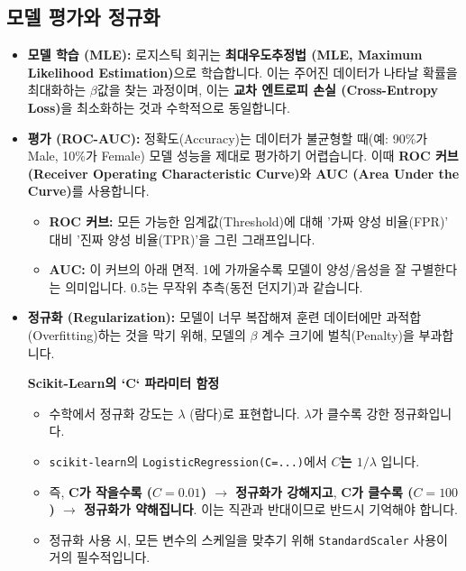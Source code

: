 \documentclass[11pt,a4paper]{book}
\theoremstyle{definition}
\begin{document}
\subsection{모델 평가와 정규화}

\begin{itemize}
    \item \textbf{모델 학습 (MLE):} 로지스틱 회귀는 \textbf{최대우도추정법 (MLE, Maximum Likelihood Estimation)}으로 학습합니다. 이는 주어진 데이터가 나타날 확률을 최대화하는 $\beta$값을 찾는 과정이며, 이는 \textbf{교차 엔트로피 손실 (Cross-Entropy Loss)}을 최소화하는 것과 수학적으로 동일합니다.
    
    \item \textbf{평가 (ROC-AUC):} 정확도(Accuracy)는 데이터가 불균형할 때(예: 90\%가 Male, 10\%가 Female) 모델 성능을 제대로 평가하기 어렵습니다. 이때 \textbf{ROC 커브 (Receiver Operating Characteristic Curve)}와 \textbf{AUC (Area Under the Curve)}를 사용합니다.
    \begin{itemize}
        \item \textbf{ROC 커브:} 모든 가능한 임계값(Threshold)에 대해 '가짜 양성 비율(FPR)' 대비 '진짜 양성 비율(TPR)'을 그린 그래프입니다.         \item \textbf{AUC:} 이 커브의 아래 면적. 1에 가까울수록 모델이 양성/음성을 잘 구별한다는 의미입니다. 0.5는 무작위 추측(동전 던지기)과 같습니다.
    \end{itemize}
    
    \item \textbf{정규화 (Regularization):} 모델이 너무 복잡해져 훈련 데이터에만 과적합(Overfitting)하는 것을 막기 위해, 모델의 $\beta$ 계수 크기에 벌칙(Penalty)을 부과합니다.
    \begin{warningbox}
    \textbf{Scikit-Learn의 `C` 파라미터 함정}
    \begin{itemize}
        \item 수학에서 정규화 강도는 $\lambda$ (람다)로 표현합니다. $\lambda$가 클수록 강한 정규화입니다.
        \item \texttt{scikit-learn}의 \texttt{LogisticRegression(C=...)}에서 \textbf{$C$는 $1/\lambda$} 입니다.
        \item 즉, \textbf{C가 작을수록 ($C=0.01$) $\rightarrow$ 정규화가 강해지고}, \textbf{C가 클수록 ($C=100$) $\rightarrow$ 정규화가 약해집니다}. 이는 직관과 반대이므로 반드시 기억해야 합니다.
        \item 정규화 사용 시, 모든 변수의 스케일을 맞추기 위해 \texttt{StandardScaler} 사용이 거의 필수적입니다.
    \end{itemize}
    \end{warningbox}
\end{itemize}
\end{document}
